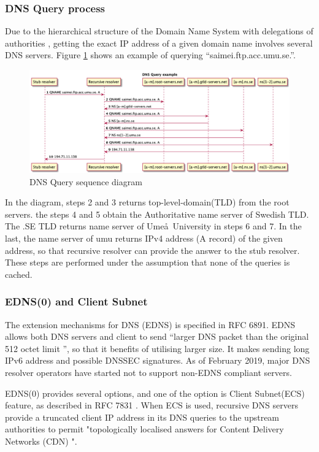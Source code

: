 \subsubsection{DNS Query process}
Due to the hierarchical structure of the Domain Name System with delegations of authorities \cite{rfc1591}, getting the exact IP address of a given domain name involves several DNS servers. Figure \ref{queryprocess} shows an example of querying ``saimei.ftp.acc.umu.se.''. 
\begin{figure}[ht!]
    \begin{center}
        \includegraphics*[width=\columnwidth]{img/dnsquery}
    \end{center}
    \caption{DNS Query sequence diagram}
    \label{queryprocess}
\end{figure}
In the diagram, steps 2 and 3 returns top-level-domain(TLD) from the root servers. the steps 4 and 5 obtain the Authoritative name server of Swedish TLD. The .SE TLD returns name server of Ume\aa\ University in steps 6 and 7. In the last, the name server of umu returns IPv4 address (A record) of the given address, so that recursive resolver can provide the answer to the stub resolver. These steps are performed under the assumption that none of the queries is cached. 
\subsubsection{EDNS(0) and Client Subnet}
The extension mechanisms for DNS (EDNS) is specified in RFC 6891. EDNS allows both DNS servers and client to send ``larger DNS packet than the original 512 octet limit \cite{rfc6891}'', so that it benefits of utilising larger size. It makes sending long IPv6 address and possible DNSSEC signatures. As of February 2019, major DNS resolver operators have started not to support non-EDNS compliant servers. 

EDNS(0) provides several options, and one of the option is Client Subnet(ECS) feature, as described in RFC 7831 \cite{rfc7871}. When ECS is used, recursive DNS servers provide a truncated client IP address in its DNS queries to the upstream authorities to permit "topologically localised answers for Content Delivery Networks (CDN) \cite{kintis2016understanding}".